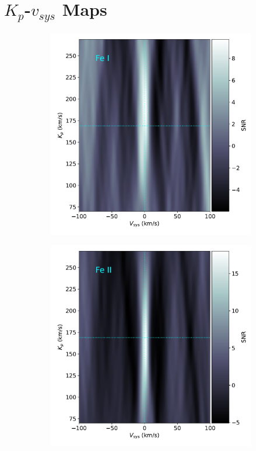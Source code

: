 \documentclass[twocolumn]{aastex631}
\begin{document}
    \section{$K_p$-$v_{sys}$ Maps}
        \begin{figure}[ht!]
            \begin{subfigure}[b]{0.3\textwidth}
                \centering
                \includegraphics[width=\textwidth]{plots-updated/kp-vsys-map/combined/KELT-20b.20190504.combined.Fe.CCFs-shifted.pdf}
            \end{subfigure}
            \begin{subfigure}[b]{0.3\textwidth}
                \centering
                \includegraphics[width=\textwidth]{plots-updated/kp-vsys-map/combined/KELT-20b.20190504.combined.Fe+.CCFs-shifted.pdf}

\end{subfigure}
\end{figure}
\end{document}
